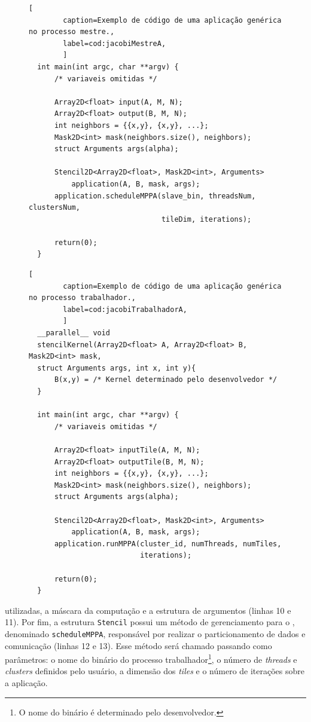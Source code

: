 \begin{figure}[!h]
    \begin{lstlisting}[
        caption=Exemplo de código de uma aplicação genérica no processo mestre.,
        label=cod:jacobiMestreA,
        ]
  int main(int argc, char **argv) {
      /* variaveis omitidas */

      Array2D<float> input(A, M, N);
      Array2D<float> output(B, M, N);
      int neighbors = {{x,y}, {x,y}, ...};
      Mask2D<int> mask(neighbors.size(), neighbors);
      struct Arguments args(alpha);

      Stencil2D<Array2D<float>, Mask2D<int>, Arguments>
          application(A, B, mask, args);
      application.scheduleMPPA(slave_bin, threadsNum, clustersNum,
                               tileDim, iterations);

      return(0);
  }
    \end{lstlisting}
\end{figure}
\begin{figure}[!h]
    \begin{lstlisting}[
        caption=Exemplo de código de uma aplicação genérica no processo trabalhador.,
        label=cod:jacobiTrabalhadorA,
        ]
  __parallel__ void
  stencilKernel(Array2D<float> A, Array2D<float> B, Mask2D<int> mask,
  struct Arguments args, int x, int y){
      B(x,y) = /* Kernel determinado pelo desenvolvedor */
  }

  int main(int argc, char **argv) {
      /* variaveis omitidas */

      Array2D<float> inputTile(A, M, N);
      Array2D<float> outputTile(B, M, N);
      int neighbors = {{x,y}, {x,y}, ...};
      Mask2D<int> mask(neighbors.size(), neighbors);
      struct Arguments args(alpha);

      Stencil2D<Array2D<float>, Mask2D<int>, Arguments>
          application(A, B, mask, args);
      application.runMPPA(cluster_id, numThreads, numTiles,
                          iterations);

      return(0);
  }
    \end{lstlisting}
\end{figure}

utilizadas, a máscara da computação e a estrutura de argumentos (linhas 10 e 11). Por fim, a
estrutura \texttt{Stencil} possui um método de gerenciamento para o \mppa,
denominado \texttt{scheduleMPPA}, responsável por realizar o particionamento de
dados e comunicação (linhas 12 e 13). Esse método será chamado passando como parâmetros: o nome
do binário do processo trabalhador\footnote{O nome do binário é determinado pelo desenvolvedor.}, o
número de \textit{threads} e \textit{clusters} definidos pelo usuário, a dimensão
dos \textit{tiles} e o número de iterações sobre a aplicação.


